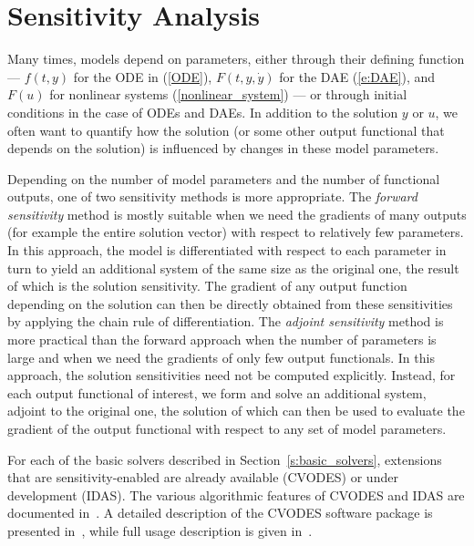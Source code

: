 \section{Sensitivity Analysis}\label{s:sensitivity_analysis}

Many times, models depend on parameters, either through their defining
function --- $f(t,y)$ for the ODE in (\ref{ODE}), $F(t,y,{\dot y})$ for the DAE
(\ref{e:DAE}), and $F(u)$ for nonlinear systems (\ref{nonlinear_system})
--- or through initial conditions in the case of ODEs and DAEs.
In addition to the solution $y$ or $u$, we often want to quantify how
the solution (or some other output functional that depends on the solution)
is influenced by changes in these model parameters.

Depending on the number of model parameters and the
number of functional outputs, one of two sensitivity methods
is more appropriate.
%
The {\em forward sensitivity} method is mostly suitable when we need
the gradients of many outputs (for example the entire solution vector)
with respect to relatively few parameters.
In this approach, the model is differentiated with respect to each
parameter in turn to yield an additional system of the same size as
the original one, the result of which is the solution sensitivity.
The gradient of any output function depending on the solution can
then be directly obtained from these sensitivities by applying the
chain rule of differentiation.
%
The {\em adjoint sensitivity} method is more practical than
the forward approach when the number of parameters is large and
when we need the gradients of only few output functionals.
In this approach, the solution sensitivities need not be computed
explicitly. Instead, for each output functional of interest, we form
and solve an additional system, adjoint to the original one, the
solution of which can then be used to evaluate the gradient of the
output functional with respect to any set of model parameters.

For each of the basic solvers described in Section~\ref{s:basic_solvers},
extensions that are sensitivity-enabled are already available (CVODES)
or under development (IDAS). 
The various algorithmic features of CVODES and IDAS are documented
in~\cite{CLPS:03}. A detailed description of the CVODES software package
is presented in~\cite{SeHi:03}, while full usage description is given
in~\cite{HiSe:04cvodes}.
%

